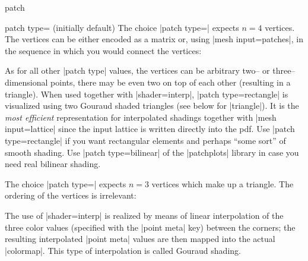 {\begin{plottype}[/pgfplots]{patch}
\begin{pgfplotskey}{patch type= (initially default)}
	The choice |patch type=| expects $n=4$ vertices. The vertices can be either encoded as a matrix or, using |mesh input=patches|, in the sequence in which you would connect the vertices:
\begin{codeexample}[]
\end{codeexample}
\begin{codeexample}[]
\end{codeexample}
	\noindent As for all other |patch type| values, the vertices can be arbitrary two-- or three--dimensional points, there may be even two on top of each other (resulting in a triangle). When used together with |shader=interp|, |patch type=rectangle| is visualized using two Gouraud shaded triangles (see below for |triangle|). It is the \emph{most efficient} representation for interpolated shadings together with |mesh input=lattice| since the input lattice is written directly into the pdf. Use |patch type=rectangle| if you want rectangular elements and perhaps ``some sort'' of smooth shading. Use |patch type=bilinear| of the |patchplots| library in case you need real bilinear shading.

	The choice |patch type=| expects $n=3$ vertices which make up a triangle. The ordering of the vertices is irrelevant: 
\begin{codeexample}[]
\end{codeexample}
	\noindent The use of |shader=interp| is realized by means of linear interpolation of the three color values (specified with the |point meta| key) between the corners; the resulting interpolated |point meta| values are then mapped into the actual |colormap|. This type of interpolation is called Gouraud shading.



\end{pgfplotskey}
\end{plottype}}

